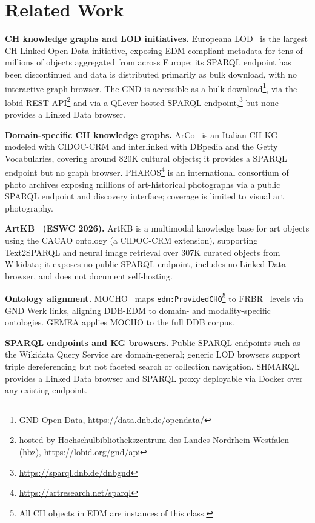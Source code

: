 
\section{Related Work}
\label{sec:related}

\textbf{CH knowledge graphs and LOD initiatives.}
Europeana LOD~\cite{haslhofer2013europeanalod} is the largest CH Linked Open Data initiative, exposing EDM-compliant metadata for tens of millions of objects aggregated from across Europe; its SPARQL endpoint has been discontinued and data is distributed primarily as bulk download, with no interactive graph browser.
The GND is accessible as a bulk download\footnote{GND Open Data, \url{https://data.dnb.de/opendata/}}, via the lobid REST API\footnote{hosted by Hochschulbibliothekszentrum des Landes Nordrhein-Westfalen (hbz), \url{https://lobid.org/gnd/api}} and via a QLever-hosted SPARQL endpoint,\footnote{\url{https://sparql.dnb.de/dnbgnd}} but none provides a Linked Data browser.

\textbf{Domain-specific CH knowledge graphs.}
ArCo~\cite{carriero2019arco} is an Italian CH KG modeled with CIDOC-CRM and interlinked with DBpedia and the Getty Vocabularies, covering around 820K cultural objects; it provides a SPARQL endpoint but no graph browser.
PHAROS\footnote{\url{https://artresearch.net/sparql}} is an international consortium of photo archives exposing millions of art-historical photographs via a public SPARQL endpoint and discovery interface; coverage is limited to visual art photography.

\textbf{ArtKB~\cite{blanco2026artkb} (ESWC 2026).}
ArtKB is a multimodal knowledge base for art objects using the CACAO ontology (a CIDOC-CRM extension), supporting Text2SPARQL and neural image retrieval over 307K curated objects from Wikidata; it exposes no public SPARQL endpoint, includes no Linked Data browser, and does not document self-hosting.

\textbf{Ontology alignment.}
MOCHO~\cite{tan2026navigating} maps \texttt{edm:ProvidedCHO}\footnote{All CH objects in EDM are instances of this class.} to FRBR~\cite{ifla1998frbr} levels via GND Werk links, aligning DDB-EDM to domain- and modality-specific ontologies. GEMEA applies MOCHO to the full DDB corpus.

\textbf{SPARQL endpoints and KG browsers.}
Public SPARQL endpoints such as the Wikidata Query Service are domain-general; generic LOD browsers support triple dereferencing but not faceted search or collection navigation.
SHMARQL~\cite{shmarql} provides a Linked Data browser and SPARQL proxy deployable via Docker over any existing endpoint.

